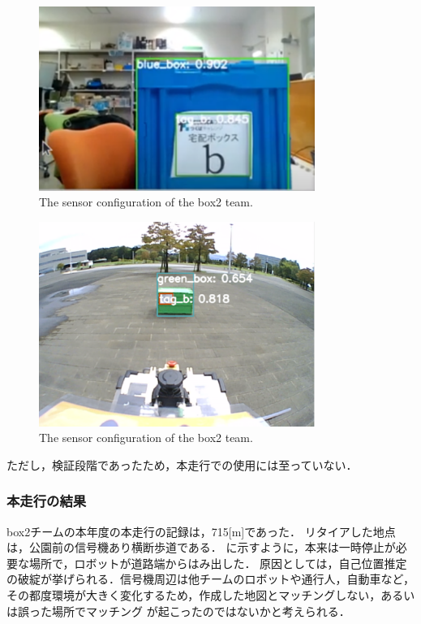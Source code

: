 \documentclass[twocolumn, 9pt]{jsproceedings}
\begin{document}
\begin{figure}[h!]
  \centering
  \includegraphics[width=90mm]{fig/test1.pdf}
  \caption{The sensor configuration of the box2 team.}
  \label{fig:test1}
\end{figure}

\begin{figure}[h!]
  \centering
  \includegraphics[width=90mm]{fig/test2.pdf}
  \caption{The sensor configuration of the box2 team.}
  \label{fig:test2}
\end{figure}


ただし，検証段階であったため，本走行での使用には至っていない．







\subsubsection{本走行の結果}
box2チームの本年度の本走行の記録は，715[m]であった．
リタイアした地点は，公園前の信号機あり横断歩道である．
に示すように，本来は一時停止が必要な場所で，ロボットが道路端からはみ出した．
原因としては，自己位置推定の破綻が挙げられる．信号機周辺は他チームのロボットや通行人，自動車など，
その都度環境が大きく変化するため，作成した地図とマッチングしない，あるいは誤った場所でマッチング
が起こったのではないかと考えられる．
\end{document}
